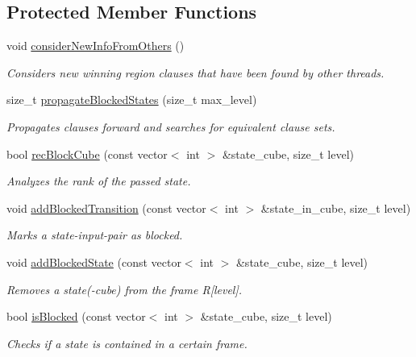 \subsection*{Protected Member Functions}
\begin{DoxyCompactItemize}
\item 
void \hyperlink{classIFM13Explorer_ae2e510e5b13e7166c5d6170a286a7295}{consider\-New\-Info\-From\-Others} ()
\begin{DoxyCompactList}\small\item\em Considers new winning region clauses that have been found by other threads. \end{DoxyCompactList}\item 
size\-\_\-t \hyperlink{classIFM13Explorer_a52595f5290210c0a79b45c9a077abdb2}{propagate\-Blocked\-States} (size\-\_\-t max\-\_\-level)
\begin{DoxyCompactList}\small\item\em Propagates clauses forward and searches for equivalent clause sets. \end{DoxyCompactList}\item 
bool \hyperlink{classIFM13Explorer_a7ca0b39a9868d8d03b2cafa412dfb640}{rec\-Block\-Cube} (const vector$<$ int $>$ \&state\-\_\-cube, size\-\_\-t level)
\begin{DoxyCompactList}\small\item\em Analyzes the rank of the passed state. \end{DoxyCompactList}\item 
void \hyperlink{classIFM13Explorer_a32d465971c73d0eaaa452bbf9622711f}{add\-Blocked\-Transition} (const vector$<$ int $>$ \&state\-\_\-in\-\_\-cube, size\-\_\-t level)
\begin{DoxyCompactList}\small\item\em Marks a state-\/input-\/pair as blocked. \end{DoxyCompactList}\item 
void \hyperlink{classIFM13Explorer_a827db69cd48eb1b82a6e2bcdea69f06b}{add\-Blocked\-State} (const vector$<$ int $>$ \&state\-\_\-cube, size\-\_\-t level)
\begin{DoxyCompactList}\small\item\em Removes a state(-\/cube) from the frame R\mbox{[}level\mbox{]}. \end{DoxyCompactList}\item 
bool \hyperlink{classIFM13Explorer_a6f84ca906e3d15b9bf7b3df71f379fa1}{is\-Blocked} (const vector$<$ int $>$ \&state\-\_\-cube, size\-\_\-t level)
\begin{DoxyCompactList}\small\item\em Checks if a state is contained in a certain frame. \end{DoxyCompactList}\item 

\end{DoxyCompactItemize}
